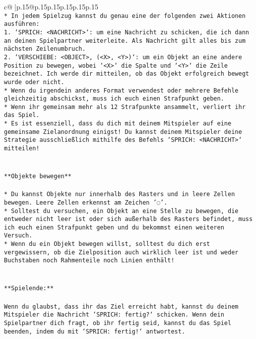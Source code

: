 \documentclass{article}
\begin{document}
{\begin{supertabular}{c@{$\;$}|p{.15\linewidth}@{}p{.15\linewidth}p{.15\linewidth}p{.15\linewidth}p{.15\linewidth}p{.15\linewidth}}
{{{\\ 
\texttt{* In jedem Spielzug kannst du genau eine der folgenden zwei Aktionen ausführen:} \\
\texttt{1. `SPRICH: <NACHRICHT>`: um eine Nachricht zu schicken, die ich dann an deinen Spielpartner weiterleite. Als Nachricht gilt alles bis zum nächsten Zeilenumbruch.} \\
\texttt{2. `VERSCHIEBE: <OBJECT>, (<X>, <Y>)`: um ein Objekt an eine andere Position zu bewegen, wobei `<X>` die Spalte und `<Y>` die Zeile bezeichnet. Ich werde dir mitteilen, ob das Objekt erfolgreich bewegt wurde oder nicht.} \\
\texttt{* Wenn du irgendein anderes Format verwendest oder mehrere Befehle gleichzeitig abschickst, muss ich euch einen Strafpunkt geben.} \\
\texttt{* Wenn ihr gemeinsam mehr als 12 Strafpunkte ansammelt, verliert ihr das Spiel.} \\
\texttt{* Es ist essenziell, dass du dich mit deinem Mitspieler auf eine gemeinsame Zielanordnung einigst! Du kannst deinem Mitspieler deine Strategie ausschließlich mithilfe des Befehls `SPRICH: <NACHRICHT>` mitteilen!} \\
\\ 
\\ 
\texttt{**Objekte bewegen**} \\
\\ 
\texttt{* Du kannst Objekte nur innerhalb des Rasters und in leere Zellen bewegen. Leere Zellen erkennst am Zeichen '◌'.} \\
\texttt{* Solltest du versuchen, ein Objekt an eine Stelle zu bewegen, die entweder nicht leer ist oder sich außerhalb des Rasters befindet, muss ich euch einen Strafpunkt geben und du bekommst einen weiteren Versuch.} \\
\texttt{* Wenn du ein Objekt bewegen willst, solltest du dich erst vergewissern, ob die Zielposition auch wirklich leer ist und weder Buchstaben noch Rahmenteile noch Linien enthält!} \\
\\ 
\\ 
\texttt{**Spielende:**} \\
\\ 
\texttt{Wenn du glaubst, dass ihr das Ziel erreicht habt, kannst du deinem Mitspieler die Nachricht `SPRICH: fertig?` schicken. Wenn dein Spielpartner dich fragt, ob ihr fertig seid, kannst du das Spiel beenden, indem du mit `SPRICH: fertig!` antwortest.} \\
\\ 
}}}
\end{supertabular}}
\end{document}
